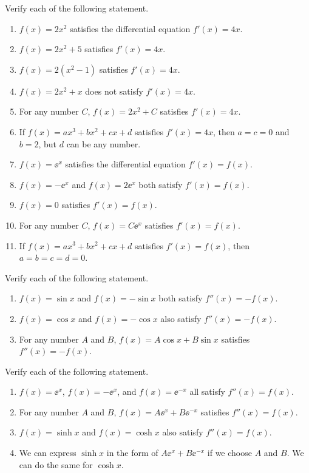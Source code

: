 \documentclass[11pt,pdfa,lastpage]{MishoNote}
\begin{document}
\begin{enumerate}[resume]
  \itemA Verify each of the following statement.
  \begin{enumerate}
    \item $f(x)=2x^2$ satisfies the differential equation $f'(x)=4x$.
    \item $f(x)=2x^2+5$ satisfies $f'(x)=4x$.
    \item $f(x)=2(x^2-1)$ satisfies $f'(x)=4x$.
    \item $f(x)=2x^2+x$ does not satisfy $f'(x)=4x$.
    \item For any number $C$, $f(x)=2x^2 + C$ satisfies $f'(x)=4x$.
    \item If $f(x)=ax^3+bx^2+cx+d$ satisfies $f'(x)=4x$, then $a=c=0$ and $b=2$, but $d$ can be any number.
  \medskip
    \item $f(x)=\ee^x$ satisfies the differential equation $f'(x)=f(x)$.
    \item $f(x)=-\ee^x$ and $f(x)=2\ee^x$ both satisfy $f'(x)=f(x)$.
    \item $f(x)=0$ satisfies $f'(x)=f(x)$.
    \item For any number $C$, $f(x)=C\ee^{x}$ satisfies $f'(x)=f(x)$.
    \item If $f(x)=ax^3+bx^2+cx+d$ satisfies $f'(x)=f(x)$, then $a=b=c=d=0$.
  \end{enumerate}
  \itemB Verify each of the following statement.
  \begin{enumerate}
    \item $f(x)=\sin x$ and $f(x)=-\sin x$ both satisfy $f''(x)=-f(x)$.
    \item $f(x)=\cos x$ and $f(x)=-\cos x$ also satisfy $f''(x)=-f(x)$.
    \item For any number $A$ and $B$, $f(x)=A\cos x+B\sin x$ satisfies $f''(x)=-f(x)$.
  \end{enumerate}
  \itemC Verify each of the following statement.
  \begin{enumerate}
    \item $f(x)=\ee^x$, $f(x)=-\ee^x$, and $f(x)=\ee^{-x}$ all satisfy $f''(x)=f(x)$.
    \item For any number $A$ and $B$, $f(x)=A\ee^x+B\ee^{-x}$ satisfies $f''(x)=f(x)$.
    \item $f(x)=\sinh x$ and $f(x)=\cosh x$ also satisfy $f''(x)=f(x)$.
    \item We can express $\sinh x$ in the form of $A\ee^{x}+B\ee^{-x}$ if we choose $A$ and $B$. We can do the same for $\cosh x$.
  \end{enumerate}
\end{enumerate}
\end{document}
